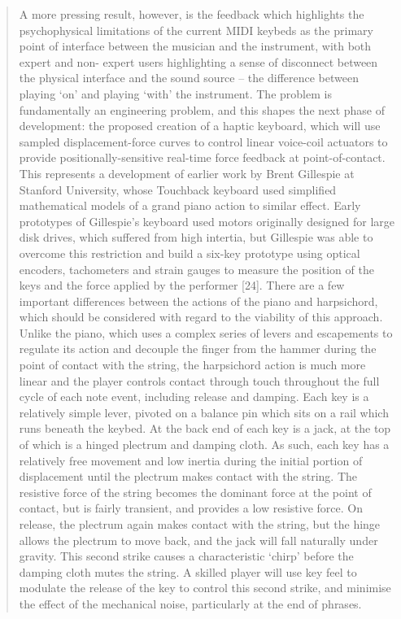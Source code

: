 \begin{quotation}
    A more pressing result, however, is the feedback which highlights the psychophysical limitations of the current MIDI keybeds as the primary point of interface between the musician and the instrument, with both expert and non- expert users highlighting a sense of disconnect between the physical interface and the sound source – the difference between playing ‘on’ and playing ‘with’ the instrument.
The problem is fundamentally an engineering problem, and this shapes the next phase of development: the proposed creation of a haptic keyboard, which will use sampled displacement-force curves to control linear voice-coil actuators to provide positionally-sensitive real-time force feedback at point-of-contact. This represents a development of earlier work by Brent Gillespie at Stanford University, whose Touchback keyboard used simplified mathematical models of a grand piano action to similar effect.
Early prototypes of Gillespie’s keyboard used motors originally designed for large disk drives, which suffered from high intertia, but Gillespie was able to overcome this restriction and build a six-key prototype using optical encoders, tachometers and strain gauges to measure the position of the keys and the force applied by the performer [24].
There are a few important differences between the actions of the piano and harpsichord, which should be considered with regard to the viability of this approach. Unlike the piano, which uses a complex series of levers and escapements to regulate its action and decouple the finger from the hammer during the point of contact with the string, the harpsichord action is much more linear and the player controls contact through touch throughout the full cycle of each note event, including release and damping.
Each key is a relatively simple lever, pivoted on a balance pin which sits on a rail which runs beneath the keybed. At the back end of each key is a jack, at the top of which is a hinged plectrum and damping cloth. As such, each key has a relatively free movement and low inertia during the initial portion of displacement until the plectrum makes contact with the string. The resistive force of the string becomes the dominant force at the point of contact, but is fairly transient, and provides a low resistive force. On release, the plectrum again makes contact with the string, but the hinge allows the plectrum to move back, and the jack will fall naturally under gravity. This second strike causes a characteristic ‘chirp’ before the damping cloth mutes the string. A skilled player will use key feel to modulate the release of the key to control this second strike, and minimise the effect of the mechanical noise, particularly at the end of phrases.

\end{quotation}
